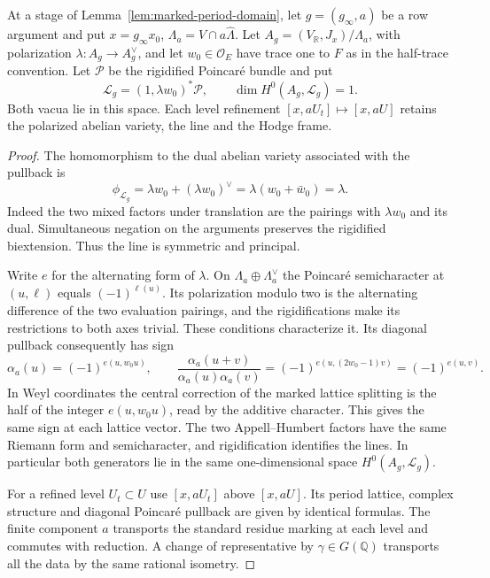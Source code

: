 \begin{auxlemma}
\label{lem:placed-row-theta}
At a stage of Lemma~\ref{lem:marked-period-domain}, let
\(g=(g_\infty,a)\) be a row argument and put
\(x=g_\infty x_0\), \(\Lambda_a=V\cap a\widehat\Lambda\).
Let \(A_g=(V_{\mathbb R},J_x)/\Lambda_a\), with polarization
\(\lambda:A_g\to A_g^\vee\), and let \(w_0\in\mathcal O_E\)
have trace one to \(F\) as in the half-trace convention.
Let \(\mathcal P\) be the rigidified Poincar\'e bundle and put
\[
  \mathcal L_g=(1,\lambda w_0)^*\mathcal P,\qquad
  \dim H^0(A_g,\mathcal L_g)=1 .
\]
Both vacua lie in this space. Each level refinement
\([x,aU_t]\mapsto[x,aU]\) retains the polarized abelian variety,
the line and the Hodge frame.
\end{auxlemma}
\begin{proof}
The homomorphism to the dual abelian variety associated with
the pullback is
\[
 \phi_{\mathcal L_g}=\lambda w_0+(\lambda w_0)^\vee
                   =\lambda(w_0+\bar w_0)=\lambda .
\]
Indeed the two mixed factors under translation are the pairings
with \(\lambda w_0\) and its dual. Simultaneous negation on
the arguments preserves the rigidified biextension. Thus the
line is symmetric and principal.

Write \(e\) for the alternating form of \(\lambda\). On
\(\Lambda_a\oplus\Lambda_a^\vee\) the Poincar\'e semicharacter
at \((u,\ell)\) equals \((-1)^{\ell(u)}\). Its polarization
modulo two is the alternating difference of the two evaluation
pairings, and the rigidifications make its restrictions to both
axes trivial. These conditions characterize it. Its diagonal
pullback consequently has sign
\[
 \alpha_a(u)=(-1)^{e(u,w_0u)},\qquad
 \frac{\alpha_a(u+v)}{\alpha_a(u)\alpha_a(v)}
   =(-1)^{e(u,(2w_0-1)v)}=(-1)^{e(u,v)} .
\]
In Weyl coordinates the central correction of the marked
lattice splitting is the half of the integer \(e(u,w_0u)\),
read by the additive character. This gives the same sign at
each lattice vector. The two Appell--Humbert factors have the
same Riemann form and semicharacter, and rigidification identifies
the lines. In particular both generators lie in the same
one-dimensional space \(H^0(A_g,\mathcal L_g)\).

For a refined level \(U_t\subset U\) use \([x,aU_t]\)
above \([x,aU]\). Its period lattice, complex structure and
diagonal Poincar\'e pullback are given by identical formulas.
The finite component \(a\) transports the standard residue
marking at each level and commutes with reduction. A change
of representative by \(\gamma\in G(\mathbb Q)\) transports
all the data by the same rational isometry.
\end{proof}

